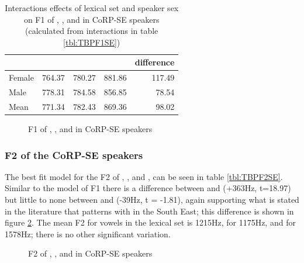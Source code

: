 \documentclass[../../../00.FullDoc/tex/APRReport-year4]{subfiles}
\begin{document}
\begin{table}[htbp]
	\centering
	\begin{tabular}{lrrrr}
		\hline
		& \multicolumn{1}{l}{\bath{}} & \multicolumn{1}{l}{\palm{}} & \multicolumn{1}{l}{\trap{}} & \multicolumn{1}{l}{\TB{} difference} \\
		\hline
		Female & 764.37 & \cellcolor[rgb]{ .816,  .808,  .808} 780.27 & 881.86 & 117.49 \\
		Male  & 778.31 & \cellcolor[rgb]{ .816,  .808,  .808} 784.58 & 856.85 & 78.54 \\
		Mean  & 771.34 & \cellcolor[rgb]{ .816,  .808,  .808} 782.43 & 869.36 & 98.02 \\
		\hline
	\end{tabular}
	\caption{Interactions effects of lexical set and speaker sex on F1 of \trap{}, \bath{}, and \palm{} in CoRP-SE speakers (calculated from interactions in table \ref{tbl:TBPF1SE})}
	\label{tbl:TBPF1SE-inter}
\end{table}

\begin{figure}[h]
	
	\caption{F1 of \bath{}, \palm{}, and \trap{}  in CoRP-SE speakers} \label{fig:TBPF1SE}
\end{figure}

\subsubsection{F2 of the CoRP-SE speakers}
The best fit model for the F2 of \trap{}, \bath{}, and \palm{}, can be seen in table \ref{tbl:TBPF2SE}. Similar to the model of F1 there is a difference between \bath{} and \trap{} (+363Hz, t=18.97) but little to none between \bath{} and \palm{} (-39Hz, t = -1.81), again supporting what is stated in the literature that \bath{} patterns with \palm{} in the South East; this difference is shown in figure \ref{fig:TBPF2SE}. The mean F2 for vowels in the \bath{} lexical set is 1215Hz, for \palm{} 1175Hz, and for \trap{} 1578Hz; there is no other significant variation.



\begin{figure}[h]
	
	\caption{F2 of \bath{}, \palm{}, and \trap{}  in CoRP-SE speakers} \label{fig:TBPF2SE}
\end{figure}
\end{document}
